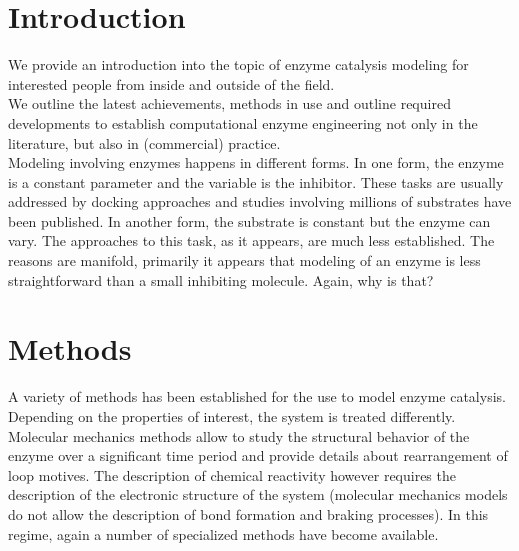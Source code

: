 \section{Introduction}\label{sec:intro}
We provide an introduction into the topic of enzyme catalysis modeling for interested people from inside and outside of the field.\\
We outline the latest achievements, methods in use and outline required developments to establish computational enzyme engineering not only in the literature, but also in (commercial) practice.\\
Modeling involving enzymes happens in different forms.
In one form, the enzyme is a constant parameter and the variable is the inhibitor.
These tasks are usually addressed by docking approaches and studies involving millions of substrates have been published\cite{zhou2010high}.
In another form, the substrate is constant but the enzyme can vary.
The approaches to this task, as it appears, are much less established.
The reasons are manifold, primarily it appears that modeling of an enzyme is less straightforward than a small inhibiting molecule.
Again, why is that?


\section{Methods}\label{sec:methods}
A variety of methods has been established for the use to model enzyme catalysis.
Depending on the properties of interest, the system is treated differently.
Molecular mechanics methods allow to study the structural behavior of the enzyme over a significant time period and provide details about rearrangement of loop motives.
The description of chemical reactivity however requires the description of the electronic structure of the system (molecular mechanics models do not allow the description of bond formation and braking processes).
In this regime, again a number of specialized methods have become available.


